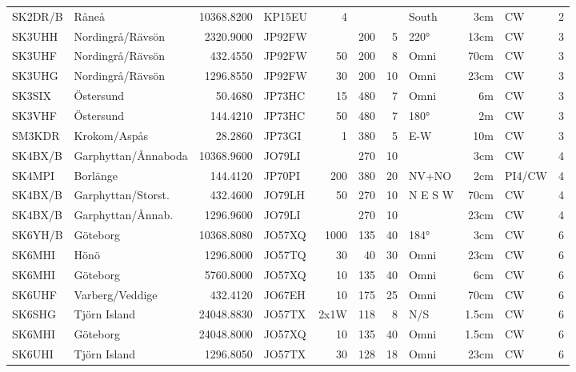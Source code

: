 \begin{longtable}{llrlrrrlrll}
	SK2DR/B  & Råneå               & 10368.8200 & KP15EU &    4 &      &      & South   &   3cm & CW     & 2    \\
	SK3UHH   & Nordingrå/Rävsön    &  2320.9000 & JP92FW &      &  200 &    5 & 220°    &  13cm & CW     & 3    \\
	SK3UHF   & Nordingrå/Rävsön    &   432.4550 & JP92FW &   50 &  200 &    8 & Omni    &  70cm & CW     & 3    \\
	SK3UHG   & Nordingrå/Rävsön    &  1296.8550 & JP92FW &   30 &  200 &   10 & Omni    &  23cm & CW     & 3    \\
	SK3SIX   & Östersund           &    50.4680 & JP73HC &   15 &  480 &    7 & Omni    &    6m & CW     & 3    \\
	SK3VHF   & Östersund           &   144.4210 & JP73HC &   50 &  480 &    7 & 180°    &    2m & CW     & 3    \\
	SM3KDR   & Krokom/Aspås        &    28.2860 & JP73GI &    1 &  380 &    5 & E-W     &   10m & CW     & 3    \\
	SK4BX/B  & Garphyttan/Ånnaboda & 10368.9600 & JO79LI &      &  270 &   10 &         &   3cm & CW     & 4    \\
	SK4MPI   & Borlänge            &   144.4120 & JP70PI &  200 &  380 &   20 & NV+NO   &   2cm & PI4/CW & 4    \\
	SK4BX/B  & Garphyttan/Storst.  &   432.4600 & JO79LH &   50 &  270 &   10 & N E S W &  70cm & CW     & 4    \\
	SK4BX/B  & Garphyttan/Ånnab.   &  1296.9600 & JO79LI &      &  270 &   10 &         &  23cm & CW     & 4    \\
	SK6YH/B  & Göteborg            & 10368.8080 & JO57XQ & 1000 &  135 &   40 & 184°    &   3cm & CW     & 6    \\
	SK6MHI   & Hönö                &  1296.8000 & JO57TQ &   30 &   40 &   30 & Omni    &  23cm & CW     & 6    \\
	SK6MHI   & Göteborg            &  5760.8000 & JO57XQ &   10 &  135 &   40 & Omni    &   6cm & CW     & 6    \\
	SK6UHF   & Varberg/Veddige     &   432.4120 & JO67EH &   10 &  175 &   25 & Omni    &  70cm & CW     & 6    \\
	SK6SHG   & Tjörn Island        & 24048.8830 & JO57TX & 2x1W &  118 &    8 & N/S     & 1.5cm & CW     & 6    \\
	SK6MHI   & Göteborg            & 24048.8000 & JO57XQ &   10 &  135 &   40 & Omni    & 1.5cm & CW     & 6    \\
	SK6UHI   & Tjörn Island        &  1296.8050 & JO57TX &   30 &  128 &   18 & Omni    &  23cm & CW     & 6    \\

\end{longtable}
